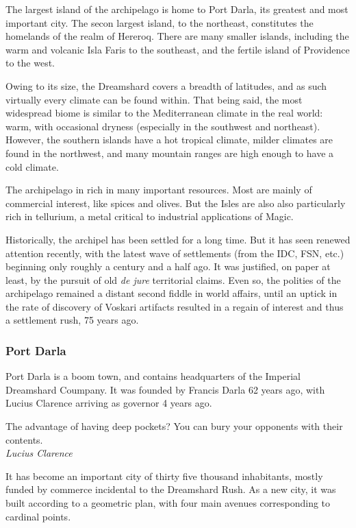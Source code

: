 The largest island of the archipelago is home to Port Darla, its greatest and most important city. The secon largest island, to the northeast, constitutes the homelands of the realm of Hereroq. There are many smaller islands, including the warm and volcanic Isla Faris to the southeast, and the fertile island of Providence to the west.

Owing to its size, the Dreamshard covers a breadth of latitudes, and as such virtually every climate can be found within. That being said, the most widespread biome is similar to the Mediterranean climate in the real world: warm, with occasional dryness (especially in the southwest and northeast). However, the southern islands have a hot tropical climate, milder climates are found in the northwest, and many mountain ranges are high enough to have a cold climate.

The archipelago in rich in many important resources. Most are mainly of commercial interest, like spices and olives. But the Isles are also also particularly rich in tellurium, a metal critical to industrial applications of Magic.

Historically, the archipel has been settled for a long time. But it has seen renewed attention recently, with the latest wave of settlements (from the IDC, FSN, etc.) beginning only roughly a century and a half ago. It was justified, on paper at least, by the pursuit of old \textit{de jure} territorial claims. Even so, the polities of the archipelago remained a distant second fiddle in world affairs, until an uptick in the rate of discovery of Voskari artifacts resulted in a regain of interest and thus a settlement rush, 75 years ago.



\subsubsection{Port Darla}

Port Darla is a boom town, and contains headquarters of the Imperial Dreamshard Coumpany. It was founded by Francis Darla 62 years ago, with Lucius Clarence arriving as governor 4 years ago. 


\begin{rpg-quotebox}
    The advantage of having deep pockets? You can bury your opponents with their contents. \\ \textendash \textit{Lucius Clarence}
    \end{rpg-quotebox}
 
It has become an important city of thirty five thousand inhabitants, mostly funded by commerce incidental to the Dreamshard Rush. As a new city, it was built according to a geometric plan, with four main avenues corresponding to cardinal points.


